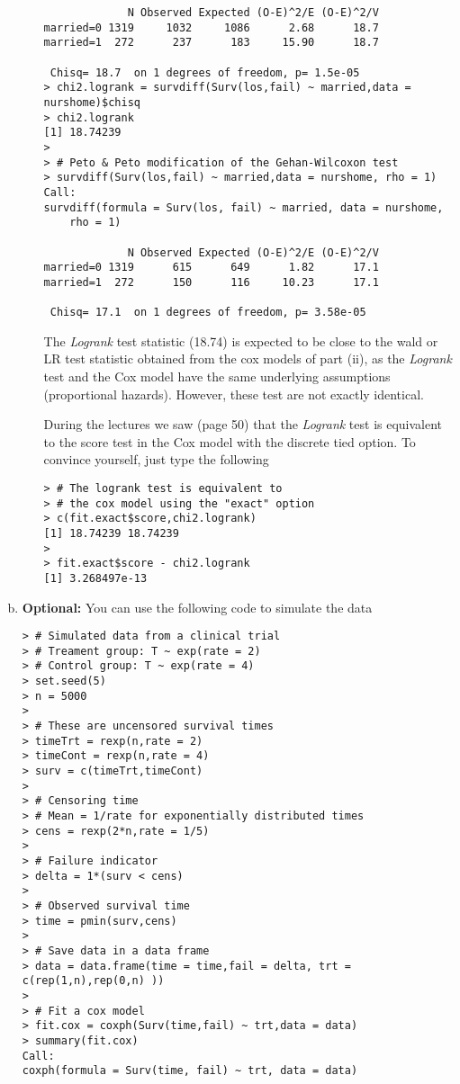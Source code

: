 \begin{enumerate}[(a)]
\begin{enumerate}[(i)]
\begin{footnotesize}
\begin{verbatim}
             N Observed Expected (O-E)^2/E (O-E)^2/V
married=0 1319     1032     1086      2.68      18.7
married=1  272      237      183     15.90      18.7

 Chisq= 18.7  on 1 degrees of freedom, p= 1.5e-05 
> chi2.logrank = survdiff(Surv(los,fail) ~ married,data = nurshome)$chisq
> chi2.logrank
[1] 18.74239
> 
> # Peto & Peto modification of the Gehan-Wilcoxon test
> survdiff(Surv(los,fail) ~ married,data = nurshome, rho = 1)
Call:
survdiff(formula = Surv(los, fail) ~ married, data = nurshome, 
    rho = 1)

             N Observed Expected (O-E)^2/E (O-E)^2/V
married=0 1319      615      649      1.82      17.1
married=1  272      150      116     10.23      17.1

 Chisq= 17.1  on 1 degrees of freedom, p= 3.58e-05 
\end{verbatim}
\end{footnotesize}
The \emph{Logrank} test statistic (18.74) is expected to be close to the wald or LR test statistic obtained from the cox models of part (ii), as the \emph{Logrank} test and the Cox model have the same underlying assumptions (proportional hazards). However, these test are not exactly identical. 

During the lectures we saw (page 50) that the \emph{Logrank} test
is equivalent to the score test in the Cox model with the discrete tied option. To convince yourself, just type the following
\begin{footnotesize}
\begin{verbatim}
> # The logrank test is equivalent to 
> # the cox model using the "exact" option
> c(fit.exact$score,chi2.logrank)
[1] 18.74239 18.74239
> 
> fit.exact$score - chi2.logrank
[1] 3.268497e-13
\end{verbatim}
\end{footnotesize}
\end{enumerate}
\item \textbf{Optional:} You can use the following code to simulate the data
\begin{footnotesize}
\begin{verbatim}
> # Simulated data from a clinical trial
> # Treament group: T ~ exp(rate = 2)
> # Control group: T ~ exp(rate = 4)
> set.seed(5)
> n = 5000
> 
> # These are uncensored survival times
> timeTrt = rexp(n,rate = 2)
> timeCont = rexp(n,rate = 4)
> surv = c(timeTrt,timeCont)
> 
> # Censoring time
> # Mean = 1/rate for exponentially distributed times
> cens = rexp(2*n,rate = 1/5)
> 
> # Failure indicator
> delta = 1*(surv < cens) 
> 
> # Observed survival time
> time = pmin(surv,cens)
> 
> # Save data in a data frame
> data = data.frame(time = time,fail = delta, trt = c(rep(1,n),rep(0,n) ))
> 
> # Fit a cox model
> fit.cox = coxph(Surv(time,fail) ~ trt,data = data)
> summary(fit.cox)
Call:
coxph(formula = Surv(time, fail) ~ trt, data = data)


\end{verbatim}
\end{footnotesize}
\end{enumerate}
